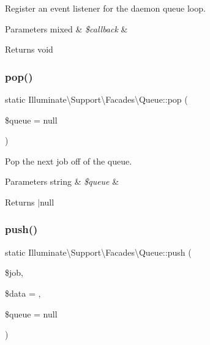 Register an event listener for the daemon queue loop.


\begin{DoxyParams}[1]{Parameters}
mixed & {\em \$callback} & \\
\hline
\end{DoxyParams}
\begin{DoxyReturn}{Returns}
void 
\end{DoxyReturn}
\mbox{\label{class_illuminate_1_1_support_1_1_facades_1_1_queue_a141667b7e321120b3ca7ac7968ec3bf5}} 
\subsubsection{\texorpdfstring{pop()}{pop()}}
{\footnotesize\ttfamily static Illuminate\textbackslash{}\+Support\textbackslash{}\+Facades\textbackslash{}\+Queue\+::pop (\begin{DoxyParamCaption}\item[{}]{\$queue = {\ttfamily null} }\end{DoxyParamCaption})\hspace{0.3cm}{\ttfamily [static]}}

Pop the next job off of the queue.


\begin{DoxyParams}[1]{Parameters}
string & {\em \$queue} & \\
\hline
\end{DoxyParams}
\begin{DoxyReturn}{Returns}
$\vert$null 
\end{DoxyReturn}
\mbox{\label{class_illuminate_1_1_support_1_1_facades_1_1_queue_a089d965181938d50eb14b2b02b13000d}} 
\subsubsection{\texorpdfstring{push()}{push()}}
{\footnotesize\ttfamily static Illuminate\textbackslash{}\+Support\textbackslash{}\+Facades\textbackslash{}\+Queue\+::push (\begin{DoxyParamCaption}\item[{}]{\$job,  }\item[{}]{\$data = {\ttfamily \textquotesingle{}\textquotesingle{}},  }\item[{}]{\$queue = {\ttfamily null} }\end{DoxyParamCaption})\hspace{0.3cm}{\ttfamily [static]}}

